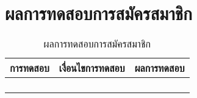 \section{ผลการทดสอบการสมัครสมาชิก}
\begin{table}[H]
	\caption{ผลการทดสอบการสมัครสมาชิก}
    \centering	
	\label{tab:test1}
    \begin{tabular}{ | p{4cm} | p{4cm} | p{4cm} |}
    \hline
	\multicolumn{1}{|c|}{การทดสอบ} & \multicolumn{1}{c|}{เงื่อนไขการทดสอบ} & \multicolumn{1}{c|}{ผลการทดสอบ} \\ \hline
	\setstretch{1.0}{ทดสอบการสมัครสมาชิก}
	& \setstretch{1.0}{ผู้ใช้งานเข้ามาในหน้าสมัครสมาชิก}
	& \setstretch{1.0}{ระบบแสดงหน้าสมัครสมาชิก} \\ \cline{2-3} 
	& \setstretch{1.0}{ผู้ใช้ไม่หรอกข้อมูลชื่อและรหัสผ่าน} 
	& \setstretch{1.0}{ระบบจะแสดงข้อความว่า  ชื่อผู้ใช้หรือรหัสผ่านไม่ถูกต้อง } \\ \cline{2-3} 
	& \setstretch{1.0}{ผู้ใช้กดปุ่มสมัครสมาชิกโดยกรอกชื่อซ้ำกับชื่อที่มีอยู่ในระบบ}  
	& \setstretch{1.0}{ระบบจะแสดงข้อความว่า  ชื่อผู้ใช้หรือรหัสผ่านไม่ถูกต้อง } \\ \cline{2-3} 
	& \setstretch{1.0}{ผู้ใช้กดปุ่มสมัครสมาชิกโดยกรอกชื่อไม่ซ้ำกับชื่อที่มีอยู่ในระบบ} 
	& \setstretch{1.0}{มีข้อความแสดงบอกผู้ใช้ว่า  สมัครสมาชิกสำเร็จ } \\ \hline
    \end{tabular}
\end{table}

